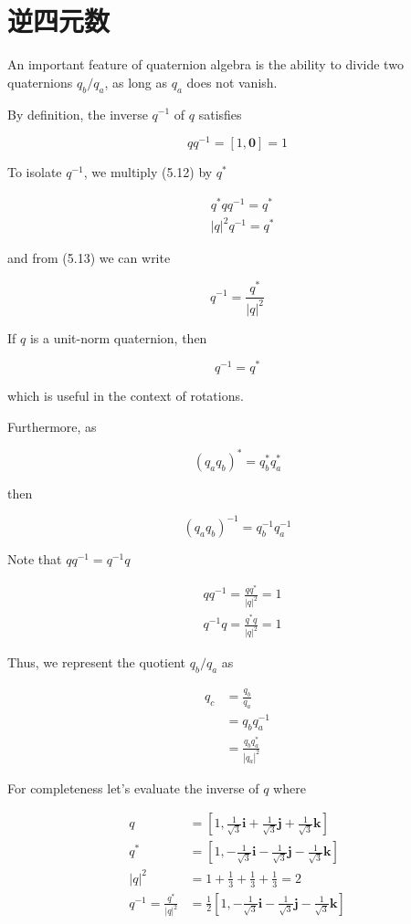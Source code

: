 \section{逆四元数}
An important feature of quaternion algebra is the ability to divide two quaternions $q_{b} / q_{a}$, as long as $q_{a}$ does not vanish.

By definition, the inverse $q^{-1}$ of $q$ satisfies

$$
q q^{-1}=[1, \mathbf{0}]=1
$$

To isolate $q^{-1}$, we multiply (5.12) by $q^{*}$

$$
\begin{aligned}
& q^{*} q q^{-1}=q^{*} \\
& |q|^{2} q^{-1}=q^{*}
\end{aligned}
$$

and from (5.13) we can write

$$
q^{-1}=\frac{q^{*}}{|q|^{2}}
$$

If $q$ is a unit-norm quaternion, then

$$
q^{-1}=q^{*}
$$

which is useful in the context of rotations.

Furthermore, as

$$
\left(q_{a} q_{b}\right)^{*}=q_{b}^{*} q_{a}^{*}
$$

then

$$
\left(q_{a} q_{b}\right)^{-1}=q_{b}^{-1} q_{a}^{-1}
$$

Note that $q q^{-1}=q^{-1} q$

$$
\begin{aligned}
& q q^{-1}=\frac{q q^{*}}{|q|^{2}}=1 \\
& q^{-1} q=\frac{q^{*} q}{|q|^{2}}=1
\end{aligned}
$$

Thus, we represent the quotient $q_{b} / q_{a}$ as

$$
\begin{aligned}
q_{c} & =\frac{q_{b}}{q_{a}} \\
& =q_{b} q_{a}^{-1} \\
& =\frac{q_{b} q_{a}^{*}}{\left|q_{a}\right|^{2}}
\end{aligned}
$$

For completeness let's evaluate the inverse of $q$ where

$$
\begin{aligned}
q & =\left[1, \frac{1}{\sqrt{3}} \mathbf{i}+\frac{1}{\sqrt{3}} \mathbf{j}+\frac{1}{\sqrt{3}} \mathbf{k}\right] \\
q^{*} & =\left[1,-\frac{1}{\sqrt{3}} \mathbf{i}-\frac{1}{\sqrt{3}} \mathbf{j}-\frac{1}{\sqrt{3}} \mathbf{k}\right] \\
|q|^{2} & =1+\frac{1}{3}+\frac{1}{3}+\frac{1}{3}=2 \\
q^{-1}=\frac{q^{*}}{|q|^{2}} & =\frac{1}{2}\left[1,-\frac{1}{\sqrt{3}} \mathbf{i}-\frac{1}{\sqrt{3}} \mathbf{j}-\frac{1}{\sqrt{3}} \mathbf{k}\right]
\end{aligned}
$$

